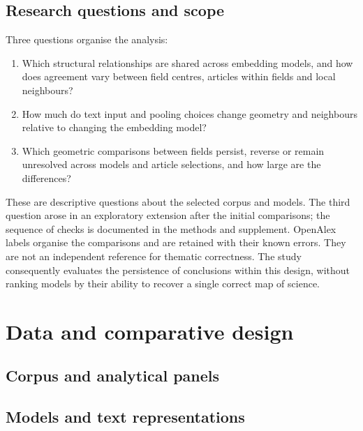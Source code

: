 \documentclass[12pt]{article}
\begin{document}
\subsection{Research questions and scope}
Three questions organise the analysis:

\begin{enumerate}
\item[\textbf{RQ1.}] Which structural relationships are shared across embedding models, and how does agreement vary between field centres, articles within fields and local neighbours?
\item[\textbf{RQ2.}] How much do text input and pooling choices change geometry and neighbours relative to changing the embedding model?
\item[\textbf{RQ3.}] Which geometric comparisons between fields persist, reverse or remain unresolved across models and article selections, and how large are the differences?
\end{enumerate}

These are descriptive questions about the selected corpus and models. The third question arose in an exploratory extension after the initial comparisons; the sequence of checks is documented in the methods and supplement. OpenAlex labels organise the comparisons and are retained with their known errors. They are not an independent reference for thematic correctness. The study consequently evaluates the persistence of conclusions within this design, without ranking models by their ability to recover a single correct map of science.

\clearpage
\section{Data and comparative design}
\subsection{Corpus and analytical panels}


\subsection{Models and text representations}

\end{document}
